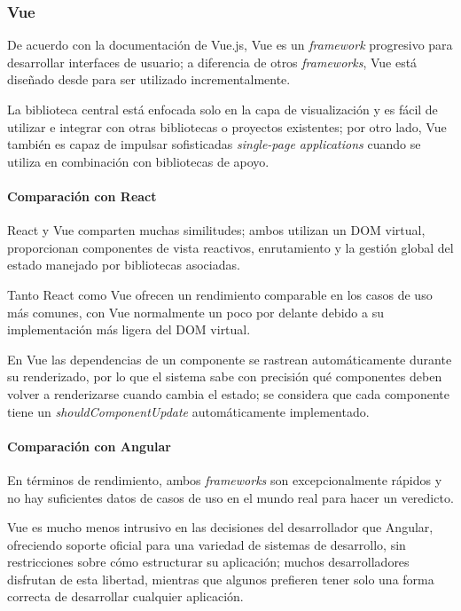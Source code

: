 \subsubsection*{Vue}

De acuerdo con la documentación de Vue.js\cite{noauthor_que_nodate}, Vue es un \textit{framework} progresivo para desarrollar interfaces de usuario; a diferencia de otros \textit{frameworks}, Vue está diseñado desde para ser utilizado incrementalmente.


La biblioteca central está enfocada solo en la capa de visualización y es fácil de utilizar e integrar con otras bibliotecas o proyectos existentes; por otro lado, Vue también es capaz de impulsar sofisticadas \textit{single-page applications} cuando se utiliza en combinación con bibliotecas de apoyo.


\paragraph*{Comparación con React}

React y Vue comparten muchas similitudes; ambos utilizan un DOM virtual, proporcionan componentes de vista reactivos, enrutamiento y la gestión global del estado manejado por bibliotecas asociadas.


Tanto React como Vue ofrecen un rendimiento comparable en los casos de uso más comunes, con Vue normalmente un poco por delante debido a su implementación más ligera del DOM virtual.


En Vue las dependencias de un componente se rastrean automáticamente durante su renderizado, por lo que el sistema sabe con precisión qué componentes deben volver a renderizarse cuando cambia el estado; se considera que cada componente tiene un \textit{shouldComponentUpdate} automáticamente implementado.


\paragraph*{Comparación con Angular}
En términos de rendimiento, ambos \textit{frameworks} son excepcionalmente rápidos y no hay suficientes datos de casos de uso en el mundo real para hacer un veredicto.


Vue es mucho menos intrusivo en las decisiones del desarrollador que Angular, ofreciendo soporte oficial para una variedad de sistemas de desarrollo, sin restricciones sobre cómo estructurar su aplicación; muchos desarrolladores disfrutan de esta libertad, mientras que algunos prefieren tener solo una forma correcta de desarrollar cualquier aplicación.


